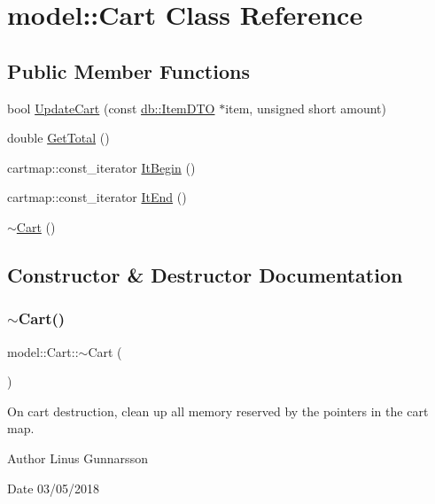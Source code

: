 \hypertarget{classmodel_1_1Cart}{}\section{model\+:\+:Cart Class Reference}
\label{classmodel_1_1Cart}
\subsection*{Public Member Functions}
\begin{DoxyCompactItemize}
\item 
bool \mbox{\hyperlink{classmodel_1_1Cart_a34a29b08e5d925fdb9ad9c4b4685c7c3}{Update\+Cart}} (const \mbox{\hyperlink{classdb_1_1ItemDTO}{db\+::\+Item\+D\+TO}} $\ast$item, unsigned short amount)
\item 
double \mbox{\hyperlink{classmodel_1_1Cart_ad214fba3ad7b762c89e0bf5336d8a312}{Get\+Total}} ()
\item 
cartmap\+::const\+\_\+iterator \mbox{\hyperlink{classmodel_1_1Cart_a2483c346d68425ff3d1e8ea5f50959e3}{It\+Begin}} ()
\item 
cartmap\+::const\+\_\+iterator \mbox{\hyperlink{classmodel_1_1Cart_a83deca31686c6f0a0880e97d71ea27cc}{It\+End}} ()
\item 
\mbox{\hyperlink{classmodel_1_1Cart_a9ef0bd14d307ae19c2fc265bbea9da61}{$\sim$\+Cart}} ()
\end{DoxyCompactItemize}


\subsection{Constructor \& Destructor Documentation}
\mbox{\label{classmodel_1_1Cart_a9ef0bd14d307ae19c2fc265bbea9da61}} 
\subsubsection{\texorpdfstring{$\sim$\+Cart()}{~Cart()}}
{\footnotesize\ttfamily model\+::\+Cart\+::$\sim$\+Cart (\begin{DoxyParamCaption}{ }\end{DoxyParamCaption})\hspace{0.3cm}{\ttfamily [inline]}}

On cart destruction, clean up all memory reserved by the pointers in the cart map. \begin{DoxyAuthor}{Author}
Linus Gunnarsson 
\end{DoxyAuthor}
\begin{DoxyDate}{Date}
03/05/2018 
\end{DoxyDate}


